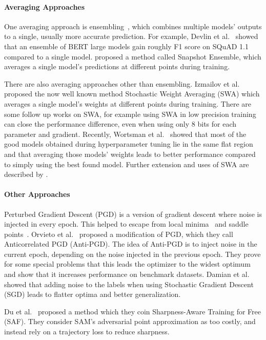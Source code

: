 \documentclass[runningheads]{llncs}
\begin{document}
\paragraph*{Averaging Approaches}
One averaging approach is ensembling~\cite{zhou2012ensemble}, which combines multiple models' outputs to a single, usually more accurate prediction.
For example, Devlin et al.~\cite{bert} showed that an ensemble of BERT large models gain roughly  F1 score on SQuAD 1.1 compared to a single model.
\cite{snapshot} proposed a method called Snapshot Ensemble, which averages a single model's predictions at different points during training.

There are also averaging approaches other than ensembling.
Izmailov et al.~\cite{swa} proposed the now well known method Stochastic Weight Averaging (SWA) which averages a single model's weights at different points during training.
There are some follow up works on SWA, for example using SWA in low precision training can close the performance difference, even when using only 8 bits for each parameter and gradient\cite{DBLP:conf/icml/YangZKBWS19}.
Recently, Wortsman et al.~\cite{soup} showed that most of the good models obtained during hyperparameter tuning lie in the same flat region and that averaging those models' weights leads to better performance compared to simply using the best found model.
Further extension and uses of SWA are described by \cite{DBLP:conf/iclr/GuptaSD20,swaRe}.

\paragraph*{Other Approaches}
Perturbed Gradient Descent (PGD) is a version of gradient descent where noise is injected in every epoch. 
This helped to escape from local minima~\cite{pgd_localminima} and saddle points~\cite{pgd_saddle}.
Orvieto et al.~\cite{orvieto2022anticorrelated} proposed a modification of PGD, which they call Anticorrelated PGD (Anti-PGD).
The idea of Anti-PGD is to inject noise in the current epoch, depending on the noise injected in the previous epoch.
They prove for some special problems that this leads the optimizer to the widest optimum and show that it increases performance on benchmark datasets.
Damian et al.~\cite{DBLP:conf/nips/DamianML21} showed that adding noise to the labels when using Stochastic Gradient Descent (SGD) leads to flatter optima and better generalization.

Du et al.~\cite{SAF} proposed a method which they coin Sharpness-Aware Training for Free (SAF).
They consider SAM's adversarial point approximation as too costly, and instead rely on a trajectory loss to reduce sharpness.
\end{document}
